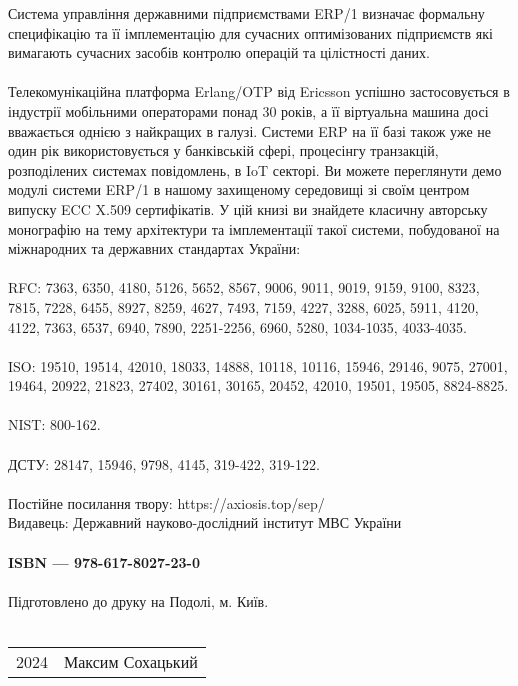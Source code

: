 Система управління державними підприємствами ERP/1 визначає формальну
специфікацію та її імплементацію для сучасних оптимізованих підприємств
які вимагають сучасних засобів контролю операцій та цілістності даних.
\\
\\
Телекомунікаційна платформа Erlang/OTP від Ericsson успішно застосовується
в індустрії мобільними операторами понад 30 років, а її віртуальна машина
досі вважається однією з найкращих в галузі. Системи ERP на її базі також
уже не один рік використовується у банківській сфері, процесінгу транзакцій,
розподілених системах повідомлень, в IoT секторі. Ви можете переглянути демо
модулі системи ERP/1 в нашому захищеному середовищі зі своїм центром
випуску ECC X.509 сертифікатів. У цій книзі ви знайдете класичну авторську
монографію на тему архітектури та імплементації такої системи, побудованої
на міжнародних та державних стандартах України:
\\
\\
RFC: 7363, 6350, 4180, 5126, 5652,
     8567, 9006, 9011, 9019, 9159, 9100, 8323, 7815, 7228, 6455,
     8927, 8259, 4627, 7493, 7159, 4227, 3288, 6025, 5911, 4120, 4122, 7363, 6537, 6940, 7890,
     2251-2256, 6960, 5280, 1034-1035, 4033-4035.
\\
\\
ISO: 19510, 19514, 42010, 18033, 14888, 10118, 10116, 15946, 29146,
     9075, 27001,
     19464, 20922, 21823, 27402, 30161, 30165,
     20452, 42010, 19501, 19505,
     8824-8825.
\\
\\
NIST: 800-162.
\\
\\
ДСТУ: 28147, 15946, 9798, 4145, 319-422, 319-122.
\\
\\
Постійне посилання твору: https://axiosis.top/sep/ \\
Видавець: Державний науково-дослідний інститут МВС України
\\
\\
{\bf ISBN --- 978-617-8027-23-0 \hspace{2em}}
\\
\\
Підготовлено до друку на Подолі, м. Київ.
\\
\\
\begin{tabular}{ll}
\textcopyright{} 2024 & Максим Сохацький
\end{tabular}

\newpage
\cleartorecto
\tableofcontents*
\mainmatter
